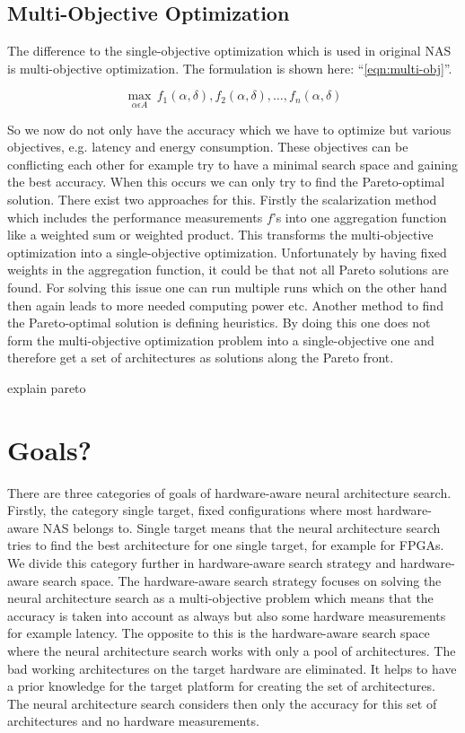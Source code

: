 \documentclass[conference]{IEEEtran}
\begin{document}
\subsection{Multi-Objective Optimization}

The difference to the single-objective optimization which is used in original NAS is multi-objective optimization. The formulation is shown here: ``\eqref{eqn:multi-obj}''.
 
\begin{equation}
\label{eqn:multi-obj}
\max_{\alpha\epsilon A}\,f_{1}(\alpha, \delta),f_{2}(\alpha, \delta),\ldots ,f_{n}(\alpha, \delta)
\end{equation}     

So we now do not only have the accuracy which we have to optimize but various objectives, e.g. latency and energy consumption. These objectives can be conflicting each other for example try to have a minimal search space and gaining the best accuracy. When this occurs we can only try to find the Pareto-optimal solution. There exist two approaches for this. Firstly the scalarization method which includes the performance measurements $f$'s into one aggregation function like a weighted sum or weighted product. This transforms the multi-objective optimization into a single-objective optimization. Unfortunately by having fixed weights in the aggregation function, it could be that not all Pareto solutions are found. For solving this issue one can run multiple runs which on the other hand then again leads to more needed computing power etc. Another method to find the Pareto-optimal solution is defining heuristics. By doing this one does not form the multi-objective optimization problem into a single-objective one and therefore get a set of architectures as solutions along the Pareto front. 

explain pareto 

\section{Goals?}
\label{section:Goals}
There are three categories of goals of hardware-aware neural architecture search. Firstly, the category single target, fixed configurations where most hardware-aware NAS belongs to. Single target means that the neural architecture search tries to find the best architecture for one single target, for example for FPGAs. We divide this category further in hardware-aware search strategy and hardware-aware search space. The hardware-aware search strategy focuses on solving the neural architecture search as a multi-objective problem which means that the accuracy is taken into account as always but also some hardware measurements for example latency. The opposite to this is the hardware-aware search space where the neural architecture search works with only a pool of architectures. The bad working architectures on the target hardware are eliminated. It helps to have a prior knowledge for the target platform for creating the set of architectures. The neural architecture search considers then only the accuracy for this set of architectures and no hardware measurements.
\end{document}
